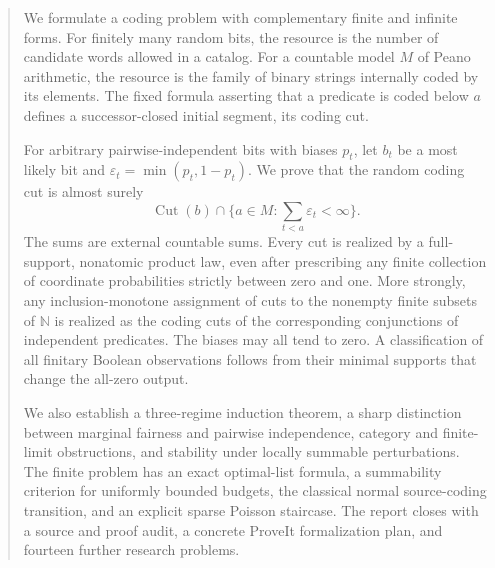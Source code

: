\documentclass[11pt]{article}
\numberwithin{equation}{section}
\theoremstyle{definition}
\theoremstyle{remark}
\newcommand{\N}{\mathbb N}
\newcommand{\Cut}{\operatorname{Cut}}
\begin{document}
\begin{abstract}
We formulate a coding problem with complementary finite and infinite forms.
For finitely many random bits, the resource is the number of candidate words
allowed in a catalog. For a countable model $M$ of Peano arithmetic, the
resource is the family of binary strings internally coded by its elements.
The fixed formula asserting that a predicate is coded below $a$ defines a
successor-closed initial segment, its coding cut.

For arbitrary pairwise-independent bits with biases $p_t$, let $b_t$ be a most likely bit and
$\varepsilon_t=\min(p_t,1-p_t)$. We prove that the random coding cut is almost
surely
\[
 \Cut(b)\cap\{a\in M:\textstyle\sum_{t<a}\varepsilon_t<\infty\}.
\]
The sums are external countable sums. Every cut is realized by a full-support,
nonatomic product law, even after prescribing any finite collection of
coordinate probabilities strictly between zero and one. More strongly, any inclusion-monotone assignment
of cuts to the nonempty finite subsets of $\N$ is realized as the coding cuts
of the corresponding conjunctions of independent predicates. The biases may
all tend to zero. A classification of all finitary Boolean observations
follows from their minimal supports that change the all-zero output.

We also establish a three-regime induction theorem, a sharp distinction
between marginal fairness and pairwise independence, category and finite-limit
obstructions, and stability under locally summable perturbations. The finite
problem has an exact optimal-list formula, a summability criterion for
uniformly bounded budgets, the classical normal source-coding transition,
and an explicit sparse Poisson staircase. The report closes with a source
and proof audit, a concrete ProveIt formalization plan, and fourteen further
research problems.
\end{abstract}
\end{document}
